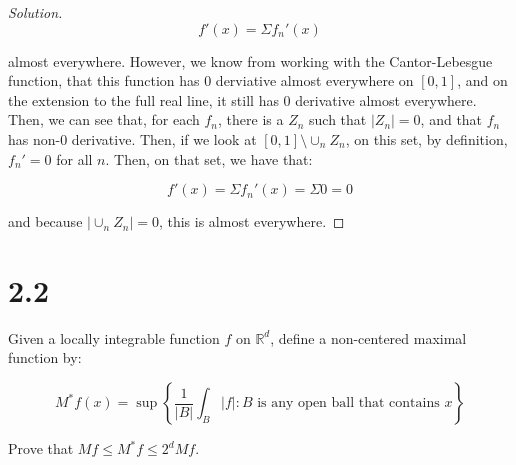 \documentclass[10pt]{article}
\newenvironment{problem}[2][Problem]{\begin{trivlist}
\item[\hskip \labelsep {\bfseries #1}\hskip \labelsep {\bfseries #2.}]}{\end{trivlist}}
\begin{document}
\begin{proof}[Solution]
$$ f'(x) = \Sigma f_n'(x) $$

almost everywhere. However, we know from working with the Cantor-Lebesgue function, that this function has 0 derviative almost everywhere on $[0,1]$, and on the extension to the full real line, it still has 0 derivative almost everywhere. Then, we can see that, for each $f_n$, there is a $Z_n$ such that $|Z_n| = 0$, and that $f_n$ has non-0 derivative. Then, if we look at $[0,1] \setminus \cup_n Z_n$, on this set, by definition, $f_n' = 0$ for all $n$. Then, on that set, we have that:

$$f'(x) = \Sigma f_n'(x) = \Sigma 0 = 0$$

and because $|\cup_n Z_n| = 0$, this is almost everywhere.

\end{proof}

\section*{2.2}

\begin{problem}{5.5.17}

Given a locally integrable function $f$ on $\mathbb{R}^d$, define a non-centered maximal function by:

$$M^*f(x) = \sup \left\{ \frac{1}{|B|} \int_B |f| : B \text{ is any open ball that contains } x \right\} $$

Prove that $Mf \leq M^*f \leq 2^d Mf$.

\end{problem}
\end{document}
